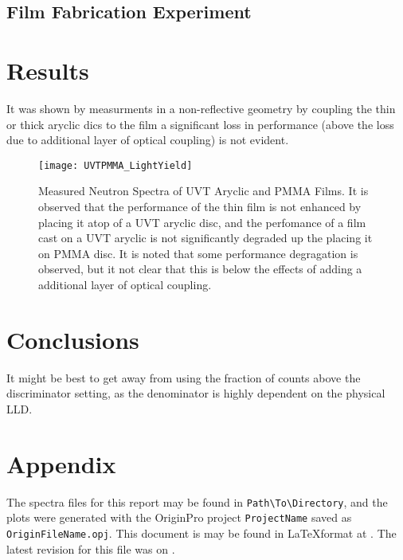 \documentclass[draftcls,onecolumn]{IEEEtran}
\begin{document}
\subsection{Film Fabrication Experiment}

\section{Results}

It was shown by measurments in a non-reflective geometry by coupling the thin or thick aryclic dics to the film a significant loss in performance (above the loss due to additional layer of optical coupling) is not evident.
\begin{figure}
  \centering
  \texttt{[image: UVTPMMA\_LightYield]}
  \caption[Measured Effect of UVT Aryclic and PMMA]{Measured Neutron Spectra of UVT Aryclic and PMMA Films. It is observed that the performance of the thin film is not enhanced by placing it atop of a UVT aryclic disc, and the perfomance of a film cast on a UVT aryclic is not significantly degraded up the placing it on PMMA disc. It is noted that some performance degragation is observed, but it not clear that this is below the effects of adding a additional layer of optical coupling.}
  \label{fig:RadMeasuredExper}
\end{figure}

\section{Conclusions}

It might be best to get away from using the fraction of counts above the discriminator setting, as the denominator is highly dependent on the physical LLD.

\pagebreak
\section{Appendix}
The spectra files for this report may be found in \texttt{Path\textbackslash To\textbackslash Directory}, and the plots were generated with the OriginPro project \texttt{ProjectName} saved as \texttt{OriginFileName.opj}.
This document is may be found in \LaTeX format at .  The latest revision for this file was \svnrev on \svndate.
\end{document}
